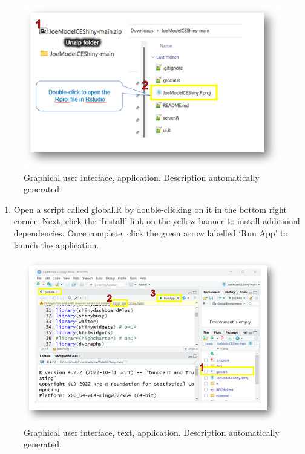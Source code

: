 \documentclass[
  letterpaper,
  DIV=11,
  numbers=noendperiod]{scrreprt}
\providecommand{\tightlist}{%
  \setlength{\itemsep}{0pt}\setlength{\parskip}{0pt}}\usepackage{longtable,booktabs,array}
\begin{document}
\begin{figure}

{\centering \includegraphics{images/image017.png}

}

\caption{\label{fig-picture48}Graphical user interface, application.
Description automatically generated.}

\end{figure}

\begin{enumerate}
\def\labelenumi{\arabic{enumi}.}
\setcounter{enumi}{2}
\tightlist
\item
  Open a script called global.R by double-clicking on it in the bottom
  right corner. Next, click the `Install' link on the yellow banner to
  install additional dependencies. Once complete, click the green arrow
  labelled `Run App' to launch the application.
\end{enumerate}

\begin{figure}

{\centering \includegraphics{images/image018.png}

}

\caption{\label{fig-picture47}Graphical user interface, text,
application. Description automatically generated.}

\end{figure}
\end{document}

